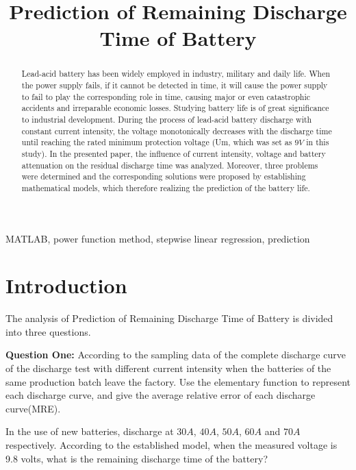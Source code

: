 \documentclass[conference]{IEEEtran}
\begin{document}
\title{Prediction of Remaining Discharge Time of Battery\\
	{}}
\author{
}

\maketitle

\begin{abstract}
	Lead-acid battery has been widely employed in industry, military and daily life. When the power supply fails, if it cannot be detected in time, it will cause the power supply to fail to play the corresponding role in time, causing major or even catastrophic accidents and irreparable economic losses. Studying battery life is of great significance to industrial development. During the process of lead-acid battery discharge with constant current intensity, the voltage monotonically decreases with the discharge time until reaching the rated minimum protection voltage (Um, which was set as $9V$ in this study). In the presented paper, the influence of current intensity, voltage and battery attenuation on the residual discharge time was analyzed. Moreover, three problems were determined and the corresponding solutions were proposed by establishing mathematical models, which therefore realizing the prediction of the battery life.
\end{abstract}
\begin{IEEEkeywords}
	MATLAB, power function method, stepwise linear regression, prediction
\end{IEEEkeywords}

\section{Introduction}
The analysis of Prediction of Remaining Discharge Time of Battery is divided into three questions.

\textbf{Question One: } According to the sampling data of the complete discharge curve of the discharge test with different current intensity when the batteries of the same production batch leave the factory. Use the elementary function to represent each discharge curve, and give the average relative error of each discharge curve(MRE). 

In the use of new batteries, discharge at $30A$, $40A$, $50A$, $60A$ and $70A$ respectively. According to the established model, when the measured voltage is 9.8 volts, what is the remaining discharge time of the battery?
\end{document}
